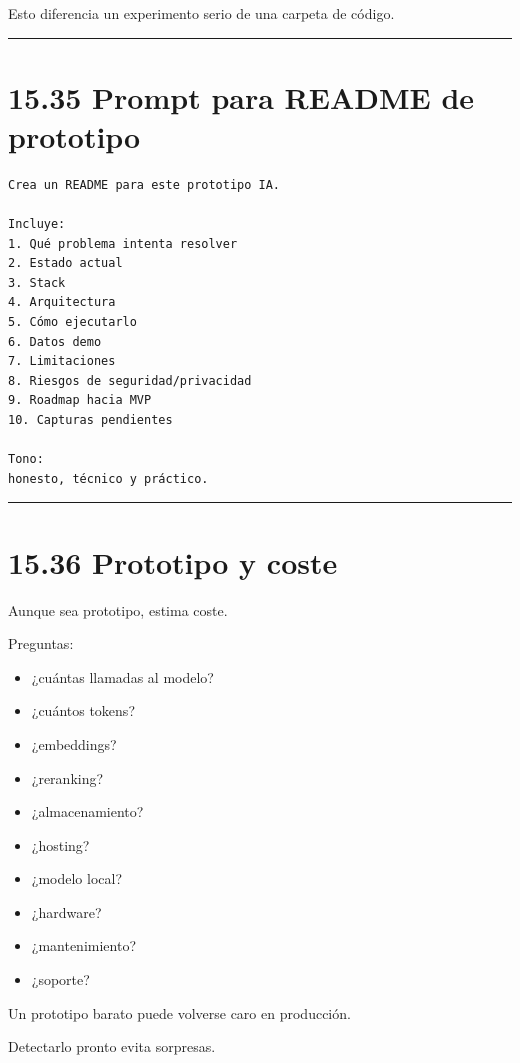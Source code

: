 Esto diferencia un experimento serio de una carpeta de código.

\begin{center}\rule{0.5\linewidth}{0.5pt}\end{center}

\section{15.35 Prompt para README de
prototipo}\label{prompt-para-readme-de-prototipo}

\begin{lstlisting}
Crea un README para este prototipo IA.

Incluye:
1. Qué problema intenta resolver
2. Estado actual
3. Stack
4. Arquitectura
5. Cómo ejecutarlo
6. Datos demo
7. Limitaciones
8. Riesgos de seguridad/privacidad
9. Roadmap hacia MVP
10. Capturas pendientes

Tono:
honesto, técnico y práctico.
\end{lstlisting}

\begin{center}\rule{0.5\linewidth}{0.5pt}\end{center}

\section{15.36 Prototipo y coste}\label{prototipo-y-coste}

Aunque sea prototipo, estima coste.

Preguntas:

\begin{itemize}
\tightlist
\item
  ¿cuántas llamadas al modelo?
\item
  ¿cuántos tokens?
\item
  ¿embeddings?
\item
  ¿reranking?
\item
  ¿almacenamiento?
\item
  ¿hosting?
\item
  ¿modelo local?
\item
  ¿hardware?
\item
  ¿mantenimiento?
\item
  ¿soporte?
\end{itemize}

Un prototipo barato puede volverse caro en producción.

Detectarlo pronto evita sorpresas.

